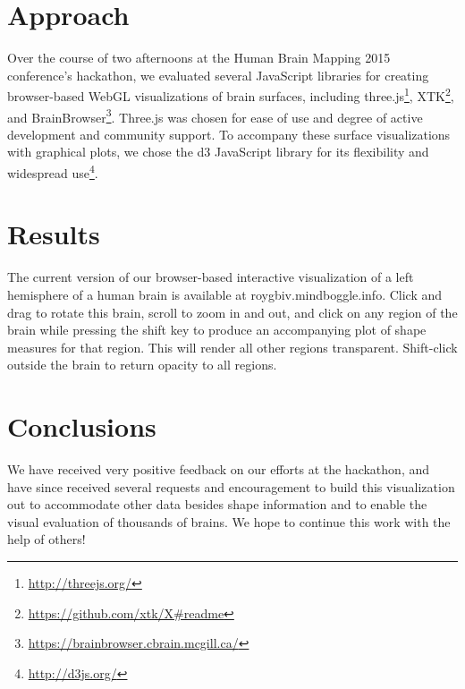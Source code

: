 \documentclass[twocolumn]{bmcart}%
\begin{document}
\section{Approach}\label{approach}

Over the course of two afternoons at the Human Brain Mapping 2015
conference's hackathon, we evaluated several JavaScript libraries for
creating browser-based WebGL visualizations of brain surfaces, including
three.js\footnote{\url{ http://threejs.org/}},
XTK\footnote{\url{https://github.com/xtk/X\#readme}}, and
BrainBrowser\footnote{\url{https://brainbrowser.cbrain.mcgill.ca/}}.
Three.js was chosen for ease of use and degree of active development and
community support. To accompany these surface visualizations with
graphical plots, we chose the d3 JavaScript library for its flexibility
and widespread use\footnote{\url{http://d3js.org/}}.

\section{Results}\label{results}

The current version of our browser-based interactive visualization of a
left hemisphere of a human brain is available at
roygbiv.mindboggle.info. Click and drag to rotate this brain, scroll to
zoom in and out, and click on any region of the brain while pressing the
shift key to produce an accompanying plot of shape measures for that
region. This will render all other regions transparent. Shift-click
outside the brain to return opacity to all regions.

\section{Conclusions}\label{conclusions}

We have received very positive feedback on our efforts at the hackathon,
and have since received several requests and encouragement to build this
visualization out to accommodate other data besides shape information
and to enable the visual evaluation of thousands of brains. We hope to
continue this work with the help of others!

\end{document}
